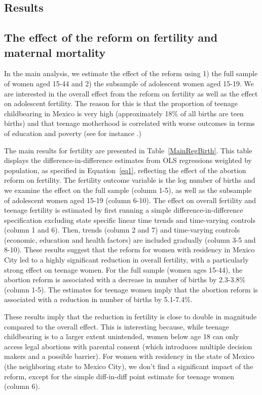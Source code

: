 \documentclass[a4paper, 11pt]{article}
\begin{document}
\begin{spacing}{2}
\section{Results}\label{scn:results}
\subsection{The effect of the reform on fertility and maternal mortality}\label{main}

In the main analysis, we estimate the effect of the reform using 1) the full sample of women aged 15-44 and 2) the subsample of adolescent women aged 15-19. We are interested in the overall effect from the reform on fertility as well as the effect on adolescent fertility. The reason for this is that the proportion of teenage childbearing in Mexico is very high (approximately 18\% of all births are teen births) and that teenage motherhood is correlated with worse outcomes in terms of education and poverty (see for instance \citep{furstenberg1976unplanned}.) 



The main results for fertility are presented in Table~\ref{MainRegBirth}. This table displays the difference-in-difference estimates from OLS regressions weighted by population, as specified in Equation~\eqref{eq1}, reflecting the effect of the abortion reform on fertility. The fertility outcome variable is the log number of births and we examine the effect on the full sample (column 1-5), as well as the subsample of adolescent women aged 15-19 (column 6-10). The effect on overall fertility and teenage fertility is estimated by first running a simple difference-in-difference specification excluding state specific linear time trends and time-varying controls (column 1 and 6). Then, trends (column 2 and 7) and time-varying controls (economic, education and health factors) are included gradually (column 3-5 and 8-10). These results suggest that the reform for women with residency in Mexico City led to a highly significant reduction in overall fertility, with a particularly strong effect on teenage women. For the full sample (women ages 15-44), the abortion reform is associated with a decrease in number of births by 2.3-3.8\% (column 1-5). The estimates for teenage women imply that the abortion reform is associated with a reduction in number of births by 5.1-7.4\%. 

These results imply that the reduction in fertility is close to double in magnitude compared to the overall effect. This is interesting because, while teenage childbearing is to a larger extent unintended, women below age 18 can only access legal abortions with parental consent (which introduces multiple decision makers and a possible barrier). For women with residency in the state of Mexico (the neighboring state to Mexico City), we don't find a significant impact of the reform, except for the simple diff-in-diff point estimate for teenage women (column 6). 


\end{spacing}
\end{document}
